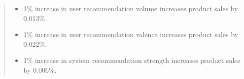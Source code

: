 \begin{quote}
\begin{itemize}
\item {1\% increase in user recommendation volume increases product sales by 0.013\%.}
\item {1\% increase in user recommendation valence increases product sales by 0.022\%.}
\item {1\% increase in system recommendation strength increases product sales by 0.006\%.}
\end{itemize}
\end{quote}
















